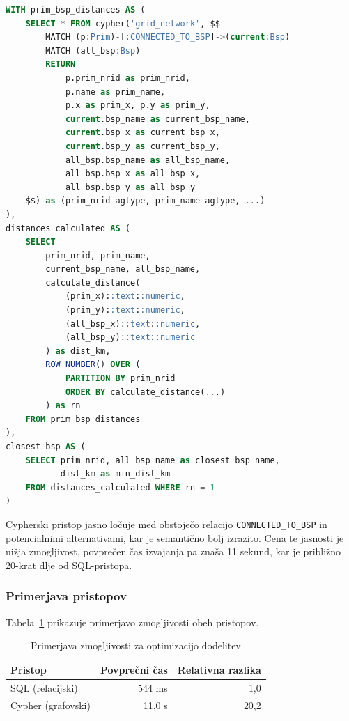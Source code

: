 \documentclass[a4paper,12pt,openright]{book}
\begin{document}
\begin{lstlisting}[language=SQL, caption={Cypher pristop - grafovska navigacija}, captionpos=b, label={lst:reassignment_cypher}]
WITH prim_bsp_distances AS (
    SELECT * FROM cypher('grid_network', $$
        MATCH (p:Prim)-[:CONNECTED_TO_BSP]->(current:Bsp)
        MATCH (all_bsp:Bsp)
        RETURN
            p.prim_nrid as prim_nrid,
            p.name as prim_name,
            p.x as prim_x, p.y as prim_y,
            current.bsp_name as current_bsp_name,
            current.bsp_x as current_bsp_x,
            current.bsp_y as current_bsp_y,
            all_bsp.bsp_name as all_bsp_name,
            all_bsp.bsp_x as all_bsp_x,
            all_bsp.bsp_y as all_bsp_y
    $$) as (prim_nrid agtype, prim_name agtype, ...)
),
distances_calculated AS (
    SELECT
        prim_nrid, prim_name,
        current_bsp_name, all_bsp_name,
        calculate_distance(
            (prim_x)::text::numeric,
            (prim_y)::text::numeric,
            (all_bsp_x)::text::numeric,
            (all_bsp_y)::text::numeric
        ) as dist_km,
        ROW_NUMBER() OVER (
            PARTITION BY prim_nrid
            ORDER BY calculate_distance(...)
        ) as rn
    FROM prim_bsp_distances
),
closest_bsp AS (
    SELECT prim_nrid, all_bsp_name as closest_bsp_name,
           dist_km as min_dist_km
    FROM distances_calculated WHERE rn = 1
)

\end{lstlisting}

Cypherski pristop jasno ločuje med obstoječo relacijo \texttt{CONNECTED\_TO\_BSP} in potencialnimi alternativami, kar je semantično bolj izrazito. Cena te jasnosti je nižja zmogljivost, povprečen čas izvajanja pa znaša 11 sekund, kar je približno 20-krat dlje od SQL-pristopa.

\subsubsection{Primerjava pristopov}

Tabela~\ref{tab:reassignment_performance} prikazuje primerjavo zmogljivosti obeh pristopov.

\begin{table}[h]
\centering
\caption{Primerjava zmogljivosti za optimizacijo dodelitev}
\label{tab:reassignment_performance}
\begin{tabular}{lrr}
\hline
\textbf{Pristop} & \textbf{Povprečni čas} & \textbf{Relativna razlika} \\
\hline
SQL (relacijski) & 544 ms & 1,0\\
Cypher (grafovski) & 11,0 s& 20,2\\
\hline
\end{tabular}
\end{table}
\end{document}
